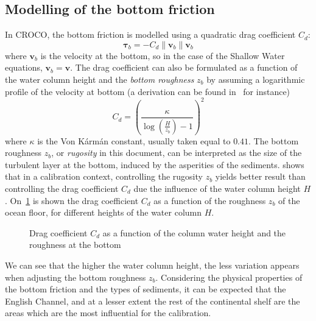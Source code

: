 \documentclass[../../Main_ManuscritThese.tex]{subfiles}
\newcommand{\CROCO}{CROCO}
\newcommand{\zob}{z_b}
\newcommand\imgpath{/home/victor/acadwriting/Manuscrit/Text/Chapter5/img/}
\begin{document}
\subsection{Modelling of the bottom friction}
\label{ssec:modelling_bottom}
In \CROCO, the bottom friction is modelled using a quadratic drag
coefficient $C_d$:
\begin{equation}
  \label{eq:bottom_stress_tau}
  \bm{\tau}_b= -C_d \|\mathbf{v}_b\|\mathbf{v}_b 
\end{equation}
where $\mathbf{v}_b$ is the velocity at the bottom, so in the case
of the Shallow Water equations, $\mathbf{v}_b = \mathbf{v}$.  The
drag coefficient can also be formulated as a function of the water
column height and the \emph{bottom roughness} $\zob$ by assuming a
logarithmic profile of the velocity at bottom (a derivation can be found in~\cite{le_bars_amandes_2010} for instance)
\begin{equation}
  \label{eq:quadratic_friction_vonkarman}
  C_d = \left(\frac{\kappa}{\log\left(\frac{H}{\zob}\right) - 1}\right)^2%
\end{equation}
where $\kappa$ is the Von K\'arm\'an constant, usually taken equal to
$0.41$.  The bottom roughness $\zob$, or \emph{rugosity} in this
document, can be interpreted as the size of the turbulent layer at the
bottom, induced by the asperities of the sediments.
\cite{boutet_estimation_2015} shows that in a calibration context,
controlling the rugosity $\zob$ yields better result than controlling
the drag coefficient $C_d$ due the influence of the water column
height $H$.
On~\cref{fig:cd_zob} is shown the drag coefficient $C_d$ as a function
of the roughness $\zob$ of the ocean floor, for different heights of
the water column $H$.
\begin{figure}[ht]
  \centering 
  \caption[Drag coefficient $C_d$ as a function of the height and the roughness]{\label{fig:cd_zob} Drag coefficient $C_d$ as a function of
    the column water height and the roughness at the bottom}
\end{figure}


We can see that the higher the water column height, the less variation
appears when adjusting the bottom roughness $\zob$.  Considering the
physical properties of the bottom friction and the types of sediments,
it can be expected that the English Channel, and at a lesser extent
the rest of the continental shelf are the areas which are the most
influential for the calibration.
\end{document}
